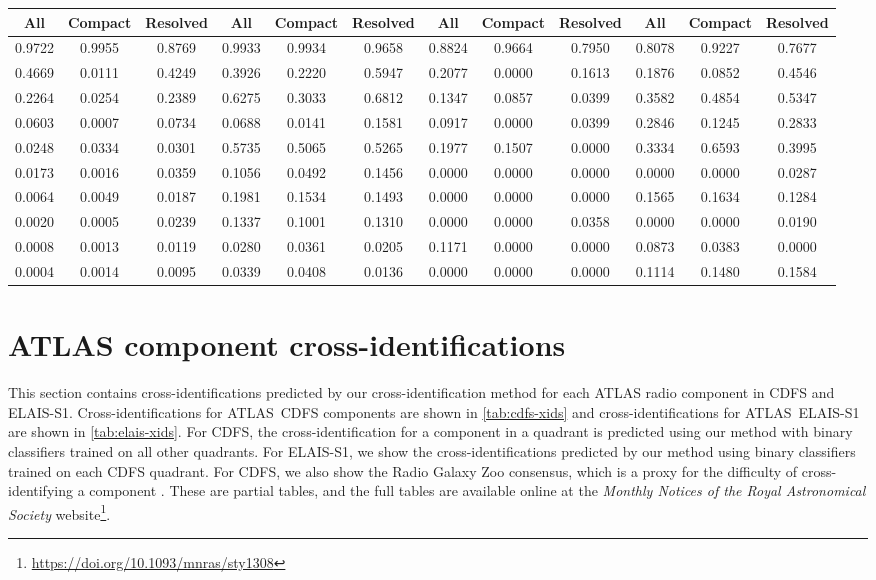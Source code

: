 \begin{table}
\begin{tabular}{cccccccccccc}
All & Compact & Resolved & All & Compact & Resolved & All & Compact & Resolved & All & Compact & Resolved \\
      \hline
0.9722 & 0.9955 & 0.8769 & 0.9933 & 0.9934 & 0.9658 & 0.8824 & 0.9664 & 0.7950 & 0.8078 & 0.9227 & 0.7677 \\
0.4669 & 0.0111 & 0.4249 & 0.3926 & 0.2220 & 0.5947 & 0.2077 & 0.0000 & 0.1613 & 0.1876 & 0.0852 & 0.4546 \\
0.2264 & 0.0254 & 0.2389 & 0.6275 & 0.3033 & 0.6812 & 0.1347 & 0.0857 & 0.0399 & 0.3582 & 0.4854 & 0.5347 \\
0.0603 & 0.0007 & 0.0734 & 0.0688 & 0.0141 & 0.1581 & 0.0917 & 0.0000 & 0.0399 & 0.2846 & 0.1245 & 0.2833 \\
0.0248 & 0.0334 & 0.0301 & 0.5735 & 0.5065 & 0.5265 & 0.1977 & 0.1507 & 0.0000 & 0.3334 & 0.6593 & 0.3995 \\
0.0173 & 0.0016 & 0.0359 & 0.1056 & 0.0492 & 0.1456 & 0.0000 & 0.0000 & 0.0000 & 0.0000 & 0.0000 & 0.0287 \\
0.0064 & 0.0049 & 0.0187 & 0.1981 & 0.1534 & 0.1493 & 0.0000 & 0.0000 & 0.0000 & 0.1565 & 0.1634 & 0.1284 \\
0.0020 & 0.0005 & 0.0239 & 0.1337 & 0.1001 & 0.1310 & 0.0000 & 0.0000 & 0.0358 & 0.0000 & 0.0000 & 0.0190 \\
0.0008 & 0.0013 & 0.0119 & 0.0280 & 0.0361 & 0.0205 & 0.1171 & 0.0000 & 0.0000 & 0.0873 & 0.0383 & 0.0000 \\
0.0004 & 0.0014 & 0.0095 & 0.0339 & 0.0408 & 0.0136 & 0.0000 & 0.0000 & 0.0000 & 0.1114 & 0.1480 & 0.1584 \\
      \hline\hline
    \end{tabular}
  \end{table}

\section{ATLAS component cross-identifications}\label{sec:atlas-xid-xids}
  
  This section contains cross-identifications predicted by our cross-identification method for each
  ATLAS radio component in CDFS and ELAIS-S1. Cross-identifications for
  ATLAS~CDFS components are shown in \autoref{tab:cdfs-xids} and
  cross-identifications for ATLAS~ELAIS-S1 are shown in
  \autoref{tab:elais-xids}. For CDFS, the cross-identification for a component
  in a quadrant is predicted using our method with binary classifiers trained
  on all other quadrants. For ELAIS-S1, we show the cross-identifications
  predicted by our method using binary classifiers trained on each CDFS
  quadrant. For CDFS, we also show the Radio Galaxy Zoo consensus, which is a
  proxy for the difficulty of cross-identifying a component \citep{wong21rgz}. These are partial tables, and the full tables are available online at the \emph{Monthly Notices of the Royal Astronomical Society} website\footnote{\url{https://doi.org/10.1093/mnras/sty1308}}.

